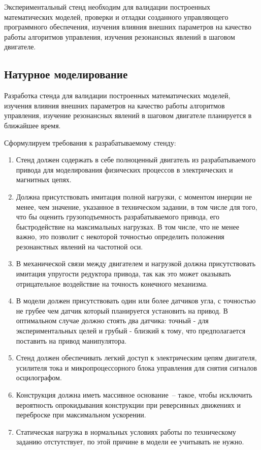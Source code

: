 \ifdefined\DIPLOMA
    Экспериментальный стенд необходим для валидации построенных математических моделей,
    проверки и отладки созданного управляющего программного обеспечения,
    изучения влияния внешних параметров на качество работы алгоритмов управления,
    изучения резонансных явлений в шаговом двигателе.
\else
    \subsection{Натурное моделирование}
    Разработка стенда для валидации построенных математических моделей, изучения
    влияния внешних параметров на качество работы алгоритмов управления, изучение
    резонансных явлений в шаговом двигателе планируется в ближайшее время.
\fi

Сформулируем требования к разрабатываемому стенду:

\begin{enumerate}
    \item Стенд должен содержать в себе полноценный двигатель из разрабатываемого
    привода для моделирования физических процессов в электрических и магнитных цепях.

    \item Должна присутствовать имитация полной нагрузки, с моментом инерции не менее, чем
    значение, указанное в техническом задании, в том числе для того, что бы оценить
    грузоподъемность разрабатываемого привода, его быстродействие на максимальных
    нагрузках. В том числе, что не менее важно, это позволит с некоторой точностью
    определить положения резонанстных явлений на частотной оси.

    \item В механической связи между двигателем и нагрузкой должна присутствовать имитация
    упругости редуктора привода, так как это может оказывать отрицательное воздействие
    на точность конечного механизма.

    \item В модели должен присутствовать один или более датчиков угла, с точностью не
    грубее чем датчик который планируется установить на привод. В оптимальном случае должно
    стоять два датчика: точный - для экспериментальных целей и грубый - близкий
    к тому, что предполагается поставить на привод манипулятора.

    \item Стенд должен обеспечивать легкий доступ к электрическим цепям двигателя,
    усилителя тока и микропроцессорного блока управления для снятия сигналов
    осцилографом.

    \item Конструкция должна иметь массивное основание~-- такое, чтобы
    исключить вероятность опрокидывания конструкции при реверсивных движениях
    и переброске при максимальном ускорении.

    \item Статическая нагрузка в нормальных условиях работы по техническому
    заданию отстутствует, по этой причине в модели ее учитывать не нужно.
\end{enumerate}
